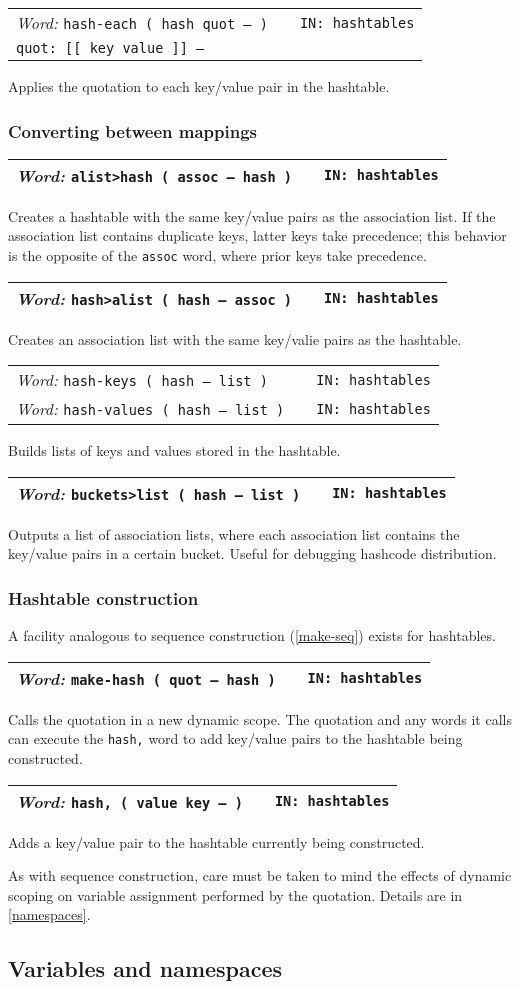 \documentclass{report}
\newcommand{\ordinaryword}[3]{\index{#1}
\emph{Word:} \texttt{#2} &&\texttt{IN: #3}}
\newcommand{\wordtable}[1]{

\begin{tabularx}{12cm}[t]{lXr}
\hline
#1\\
\hline
\end{tabularx}

}
\begin{document}
\wordtable{
\ordinaryword{hash-each}{hash-each ( hash quot -- )}{hashtables}\\
\texttt{quot:~[[ key value ]] --}
}
Applies the quotation to each key/value pair in the hashtable.

\subsubsection{Converting between mappings}

\wordtable{
\ordinaryword{alist>hash}{alist>hash ( assoc -- hash )}{hashtables}
}
Creates a hashtable with the same key/value pairs as the association list. If the association list contains duplicate keys, latter keys take precedence; this behavior is the opposite of the \texttt{assoc} word, where prior keys take precedence.
\wordtable{
\ordinaryword{hash>alist}{hash>alist ( hash -- assoc )}{hashtables}
}
Creates an association list with the same key/valie pairs as the hashtable.
\wordtable{
\ordinaryword{hash-keys}{hash-keys ( hash -- list )}{hashtables}\\
\ordinaryword{hash-values}{hash-values ( hash -- list )}{hashtables}
}
Builds lists of keys and values stored in the hashtable.
\wordtable{
\ordinaryword{buckets>list}{buckets>list ( hash -- list )}{hashtables}
}
Outputs a list of association lists, where each association list contains the key/value pairs in a certain bucket. Useful for debugging hashcode distribution.

\subsubsection{Hashtable construction}

A facility analogous to sequence construction (\ref{make-seq}) exists for hashtables.

\wordtable{
\ordinaryword{make-hash}{make-hash ( quot -- hash )}{hashtables}
}
Calls the quotation in a new dynamic scope. The quotation and any words it calls can execute the \texttt{hash,} word to add key/value pairs to the hashtable being constructed.
\wordtable{
\ordinaryword{hash,}{hash,~( value key -- )}{hashtables}
}
Adds a key/value pair to the hashtable currently being constructed.

As with sequence construction, care must be taken to mind the effects of dynamic scoping on variable assignment performed by the quotation. Details are in \ref{namespaces}.

\subsection{\label{namespaces}Variables and namespaces}
\end{document}
